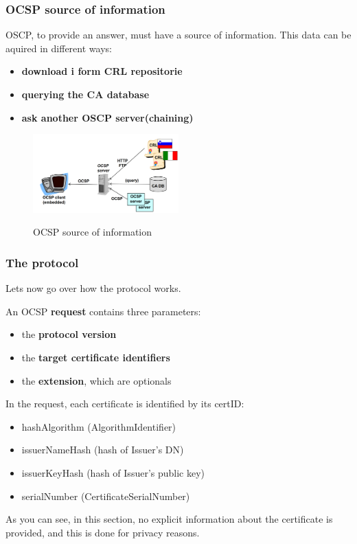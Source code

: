 \subsubsection{OCSP source of information}
OSCP, to provide an answer, must have a source of information. This
data can be aquired in different ways:
\begin{itemize}
  \item \textbf{download i form CRL repositorie}
  \item \textbf{querying the CA database}
  \item \textbf{ask another OSCP server(chaining)}
\end{itemize}
\begin{figure}[H]
  \centering
  \includegraphics[width=0.5\textwidth]{img/x509 OCSP query.png}
  \label{fig:OCSP source of information}

  \caption{OCSP source of information}
\end{figure}

\subsubsection{The protocol}
Lets now go over how the protocol works.

An OCSP \textbf{request} contains three parameters:
\begin{itemize}
  \item the \textbf{protocol version}
  \item the \textbf{target certificate identifiers}
  \item the \textbf{extension}, which are optionals
\end{itemize}
In the request, each certificate is identified by its certID:
\begin{itemize}
  \item hashAlgorithm (AlgorithmIdentifier)
  \item issuerNameHash (hash of Issuer's DN)
  \item issuerKeyHash (hash of Issuer's public key)
  \item serialNumber (CertificateSerialNumber)
\end{itemize}
As you can see, in this section, no explicit information about the 
certificate is provided, and this is done for privacy reasons.

